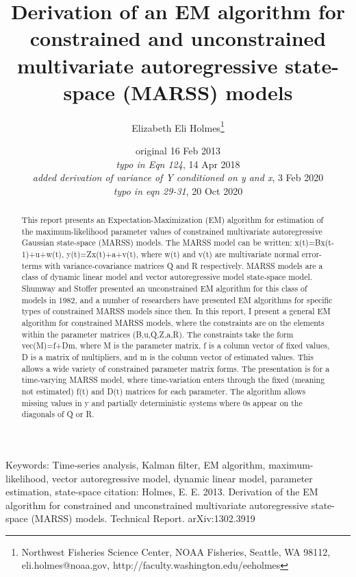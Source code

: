 \documentclass[]{article}
\begin{document}

\author{Elizabeth Eli Holmes\footnote{Northwest Fisheries Science Center, NOAA Fisheries, Seattle, WA 98112, 
       eli.holmes@noaa.gov, http://faculty.washington.edu/eeholmes}}
\title{Derivation of an EM algorithm for constrained and unconstrained multivariate autoregressive state-space (MARSS) models}
\date{original 16 Feb 2013 \\
{\small \emph{typo in Eqn 124}, 14 Apr 2018 \\
\emph{added derivation of variance of Y conditioned on y and x}, 3 Feb 2020 \\
\emph{typo in eqn 29-31}, 20 Oct 2020}}
\maketitle
\begin{abstract}
This report presents an Expectation-Maximization (EM) algorithm for estimation of the maximum-likelihood parameter values of constrained multivariate autoregressive Gaussian state-space (MARSS) models.  The MARSS model can be written: x(t)=Bx(t-1)+u+w(t), y(t)=Zx(t)+a+v(t), where w(t) and v(t) are multivariate normal error-terms with variance-covariance matrices Q and R respectively.  MARSS models are a class of dynamic linear model and vector autoregressive model state-space model. Shumway and Stoffer presented an unconstrained EM algorithm for this class of models in 1982, and a number of researchers have presented EM algorithms for specific types of constrained MARSS models since then.  In this report, I present a general EM algorithm for constrained MARSS models, where the constraints are on the elements within the parameter matrices (B,u,Q,Z,a,R). The constraints take the form vec(M)=f+Dm, where M is the parameter matrix, f is a column vector of fixed values, D is a matrix of multipliers, and m is the column vector of estimated values.  This allows a wide variety of constrained parameter matrix forms.  The presentation is for a time-varying MARSS model, where time-variation enters through the fixed (meaning not estimated) f(t) and D(t) matrices for each parameter.  The algorithm allows missing values in y and partially deterministic systems where 0s appear on the diagonals of Q or R.
\end{abstract}
Keywords: Time-series analysis, Kalman filter, EM algorithm, maximum-likelihood, vector autoregressive model, dynamic linear model, parameter estimation, state-space
\vfill
{\noindent \small citation: Holmes, E. E. 2013. Derivation of the EM algorithm for constrained and unconstrained multivariate autoregressive state-space (MARSS) models. Technical Report. arXiv:1302.3919 }
 \newpage
\end{document}
